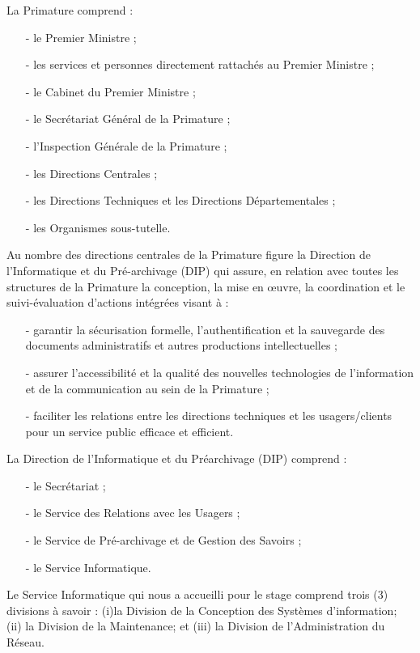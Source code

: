 La Primature comprend :
\begin{itemize}
	\item[-]le Premier Ministre ;
	\item[-]les services et personnes directement rattachés au Premier Ministre ;
	\item[-]le Cabinet du Premier Ministre ; 
	\item[-]le Secrétariat Général de la Primature ; 
	\item[-]l'Inspection Générale de la Primature ;
	\item[-]les Directions Centrales ;
	\item[-]les Directions Techniques et les Directions Départementales ;
	\item[-]les Organismes sous-tutelle.
\end{itemize}

Au nombre des directions centrales de la Primature figure la Direction de l'Informatique et du Pré-archivage (DIP) qui assure, en relation avec toutes les structures de la Primature la conception, la mise en œuvre, la coordination et le suivi-évaluation d'actions intégrées visant à :
\begin{itemize}
	\item[-]garantir la sécurisation formelle, l'authentification et la sauvegarde des documents administratifs et autres productions intellectuelles ;
	\item[-]assurer l'accessibilité et la qualité des nouvelles technologies de l'information et de la communication au sein de la Primature ;
	\item[-]faciliter les relations entre les directions techniques et les usagers/clients pour un service public efficace et efficient.
\end{itemize}
La Direction de l'Informatique et du Préarchivage (DIP) comprend :
\begin{itemize}
	\item[-]le Secrétariat ;
	\item[-]le Service des Relations avec les Usagers ;
	\item[-]le Service de Pré-archivage et de Gestion des Savoirs ;
	\item[-]le Service Informatique.
\end{itemize}

Le Service Informatique qui nous a accueilli pour le stage comprend trois (3) divisions à savoir : (i)la Division de la Conception des Systèmes d'information; (ii) la Division de la Maintenance; et (iii) la Division de l'Administration du Réseau.

